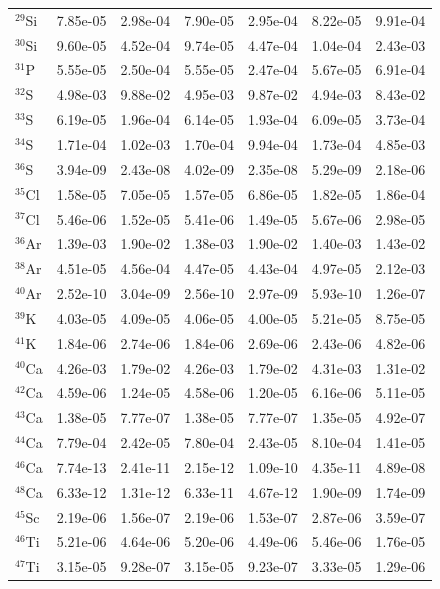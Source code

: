 \begin{table}
\begin{tabular}{l|cc|cc|cc}
$^{29}$Si & 7.85e-05 & 2.98e-04 & 7.90e-05 & 2.95e-04 & 8.22e-05 & 9.91e-04\\
$^{30}$Si & 9.60e-05 & 4.52e-04 & 9.74e-05 & 4.47e-04 & 1.04e-04 & 2.43e-03\\
$^{31}$P & 5.55e-05 & 2.50e-04 & 5.55e-05 & 2.47e-04 & 5.67e-05 & 6.91e-04\\
$^{32}$S & 4.98e-03 & 9.88e-02 & 4.95e-03 & 9.87e-02 & 4.94e-03 & 8.43e-02\\
$^{33}$S & 6.19e-05 & 1.96e-04 & 6.14e-05 & 1.93e-04 & 6.09e-05 & 3.73e-04\\
$^{34}$S & 1.71e-04 & 1.02e-03 & 1.70e-04 & 9.94e-04 & 1.73e-04 & 4.85e-03\\
$^{36}$S & 3.94e-09 & 2.43e-08 & 4.02e-09 & 2.35e-08 & 5.29e-09 & 2.18e-06\\
$^{35}$Cl & 1.58e-05 & 7.05e-05 & 1.57e-05 & 6.86e-05 & 1.82e-05 & 1.86e-04\\
$^{37}$Cl & 5.46e-06 & 1.52e-05 & 5.41e-06 & 1.49e-05 & 5.67e-06 & 2.98e-05\\
$^{36}$Ar & 1.39e-03 & 1.90e-02 & 1.38e-03 & 1.90e-02 & 1.40e-03 & 1.43e-02\\
$^{38}$Ar & 4.51e-05 & 4.56e-04 & 4.47e-05 & 4.43e-04 & 4.97e-05 & 2.12e-03\\
$^{40}$Ar & 2.52e-10 & 3.04e-09 & 2.56e-10 & 2.97e-09 & 5.93e-10 & 1.26e-07\\
$^{39}$K & 4.03e-05 & 4.09e-05 & 4.06e-05 & 4.00e-05 & 5.21e-05 & 8.75e-05\\
$^{41}$K & 1.84e-06 & 2.74e-06 & 1.84e-06 & 2.69e-06 & 2.43e-06 & 4.82e-06\\
$^{40}$Ca & 4.26e-03 & 1.79e-02 & 4.26e-03 & 1.79e-02 & 4.31e-03 & 1.31e-02\\
$^{42}$Ca & 4.59e-06 & 1.24e-05 & 4.58e-06 & 1.20e-05 & 6.16e-06 & 5.11e-05\\
$^{43}$Ca & 1.38e-05 & 7.77e-07 & 1.38e-05 & 7.77e-07 & 1.35e-05 & 4.92e-07\\
$^{44}$Ca & 7.79e-04 & 2.42e-05 & 7.80e-04 & 2.43e-05 & 8.10e-04 & 1.41e-05\\
$^{46}$Ca & 7.74e-13 & 2.41e-11 & 2.15e-12 & 1.09e-10 & 4.35e-11 & 4.89e-08\\
$^{48}$Ca & 6.33e-12 & 1.31e-12 & 6.33e-11 & 4.67e-12 & 1.90e-09 & 1.74e-09\\
$^{45}$Sc & 2.19e-06 & 1.56e-07 & 2.19e-06 & 1.53e-07 & 2.87e-06 & 3.59e-07\\
$^{46}$Ti & 5.21e-06 & 4.64e-06 & 5.20e-06 & 4.49e-06 & 5.46e-06 & 1.76e-05\\
$^{47}$Ti & 3.15e-05 & 9.28e-07 & 3.15e-05 & 9.23e-07 & 3.33e-05 & 1.29e-06\\

\end{tabular}
\end{table}
